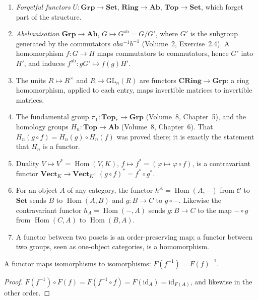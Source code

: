 \begin{example}\label{ex:functors}
\leavevmode
\begin{enumerate}[label=(\alph*)]
\item \emph{Forgetful functors} $U\colon\mathbf{Grp}\to\mathbf{Set}$, $\mathbf{Ring}\to\mathbf{Ab}$, $\mathbf{Top}\to\mathbf{Set}$, which forget part of the structure.
\item \emph{Abelianisation} $\mathbf{Grp}\to\mathbf{Ab}$, $G\mapsto G^{\mathrm{ab}}=G/G'$, where $G'$ is the subgroup generated by the commutators $aba^{-1}b^{-1}$ (Volume~2, Exercise~2.4). A homomorphism $f\colon G\to H$ maps commutators to commutators, hence $G'$ into $H'$, and induces $f^{\mathrm{ab}}\colon gG'\mapsto f(g)H'$.
\item The units $R\mapsto R^\times$ and $R\mapsto\mathrm{GL}_n(R)$ are functors $\mathbf{CRing}\to\mathbf{Grp}$: a ring homomorphism, applied to each entry, maps invertible matrices to invertible
matrices.
\item The fundamental group $\pi_1\colon\mathbf{Top}_*\to\mathbf{Grp}$ (Volume~8, Chapter~5), and the homology groups $H_n\colon\mathbf{Top}\to\mathbf{Ab}$ (Volume~8, Chapter~6). That $H_n(g\circ f)=H_n(g)\circ H_n(f)$
was proved there; it is exactly the statement that $H_n$ is a functor.
\item Duality $V\mapsto V^*=\operatorname{Hom}(V,K)$, $f\mapsto f^*=(\varphi\mapsto\varphi\circ f)$, is a contravariant functor $\mathbf{Vect}_K\to\mathbf{Vect}_K$: $(g\circ f)^*=f^*\circ g^*$.
\item For an object $A$ of any category, the functor $h^A=\operatorname{Hom}(A,-)$ from $\mathcal C$ to $\mathbf{Set}$ sends $B$ to $\operatorname{Hom}(A,B)$ and $g\colon B\to C$ to $g\circ-$. Likewise
the contravariant functor $h_A=\operatorname{Hom}(-,A)$ sends $g\colon B\to C$ to the map $-\circ g$ from $\operatorname{Hom}(C,A)$ to $\operatorname{Hom}(B,A)$.
\item A functor between two posets is an order-preserving map; a functor between two groups, seen as one-object categories, is a homomorphism.
\end{enumerate}
\end{example}

\begin{proposition}\label{prop:functoriso}
A functor maps isomorphisms to isomorphisms: $F(f^{-1})=F(f)^{-1}$.
\end{proposition}

\begin{proof}
$F(f^{-1})\circ F(f)=F(f^{-1}\circ f)=F(\mathrm{id}_A)=\mathrm{id}_{F(A)}$, and likewise in the other order.
\end{proof}

